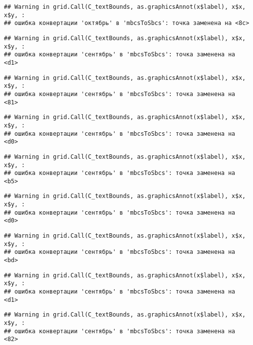 \documentclass[
]{article}
\begin{document}
\begin{verbatim}
## Warning in grid.Call(C_textBounds, as.graphicsAnnot(x$label), x$x, x$y, :
## ошибка конвертации 'октябрь' в 'mbcsToSbcs': точка заменена на <8c>
\end{verbatim}

\begin{verbatim}
## Warning in grid.Call(C_textBounds, as.graphicsAnnot(x$label), x$x, x$y, :
## ошибка конвертации 'сентябрь' в 'mbcsToSbcs': точка заменена на <d1>
\end{verbatim}

\begin{verbatim}
## Warning in grid.Call(C_textBounds, as.graphicsAnnot(x$label), x$x, x$y, :
## ошибка конвертации 'сентябрь' в 'mbcsToSbcs': точка заменена на <81>
\end{verbatim}

\begin{verbatim}
## Warning in grid.Call(C_textBounds, as.graphicsAnnot(x$label), x$x, x$y, :
## ошибка конвертации 'сентябрь' в 'mbcsToSbcs': точка заменена на <d0>
\end{verbatim}

\begin{verbatim}
## Warning in grid.Call(C_textBounds, as.graphicsAnnot(x$label), x$x, x$y, :
## ошибка конвертации 'сентябрь' в 'mbcsToSbcs': точка заменена на <b5>
\end{verbatim}

\begin{verbatim}
## Warning in grid.Call(C_textBounds, as.graphicsAnnot(x$label), x$x, x$y, :
## ошибка конвертации 'сентябрь' в 'mbcsToSbcs': точка заменена на <d0>
\end{verbatim}

\begin{verbatim}
## Warning in grid.Call(C_textBounds, as.graphicsAnnot(x$label), x$x, x$y, :
## ошибка конвертации 'сентябрь' в 'mbcsToSbcs': точка заменена на <bd>
\end{verbatim}

\begin{verbatim}
## Warning in grid.Call(C_textBounds, as.graphicsAnnot(x$label), x$x, x$y, :
## ошибка конвертации 'сентябрь' в 'mbcsToSbcs': точка заменена на <d1>
\end{verbatim}

\begin{verbatim}
## Warning in grid.Call(C_textBounds, as.graphicsAnnot(x$label), x$x, x$y, :
## ошибка конвертации 'сентябрь' в 'mbcsToSbcs': точка заменена на <82>
\end{verbatim}
\end{document}
